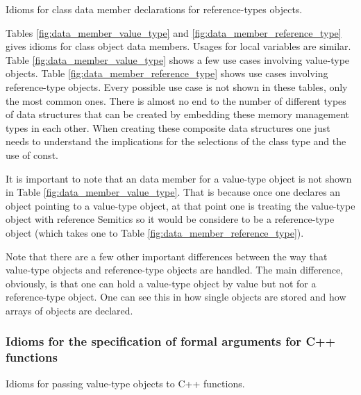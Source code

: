 \documentclass[pdf,ps2pdf,11pt]{SANDreport}
\begin{document}
\begin{table}
%
\begin{center}
%
%

%
%
\end{center}
\caption{\label{fig:data_member_reference_type}
Idioms for class data member declarations for reference-types
objects.}
%
\end{table}


Tables {}\ref{fig:data_member_value_type} and
{}\ref{fig:data_member_reference_type} gives idioms for class object
data members.  Usages for local variables are similar.  Table
{}\ref{fig:data_member_value_type} shows a few use cases involving
value-type objects.  Table {}\ref{fig:data_member_reference_type}
shows use cases involving reference-type objects.  Every possible use
case is not shown in these tables, only the most common ones.  There
is almost no end to the number of different types of data structures
that can be created by embedding these memory management types in each
other.  When creating these composite data structures one just needs
to understand the implications for the selections of the class type
and the use of const.

It is important to note that an {} data member for a
value-type object is not shown in Table
{}\ref{fig:data_member_value_type}.  That is because once one declares
an {} object pointing to a value-type object, at that point
one is treating the value-type object with reference Semitics so it
would be considere to be a reference-type object (which takes one to
Table {}\ref{fig:data_member_reference_type}).

Note that there are a few other important differences between the way
that value-type objects and reference-type objects are handled.  The
main difference, obviously, is that one can hold a value-type object
by value but not for a reference-type object.  One can see this in how
single objects are stored and how arrays of objects are declared.


%
{}\subsubsection{Idioms for the specification of formal arguments for
C++ functions}
\label{sec:idioms-for-passing-arguments}
%

\begin{table}[p]
%
\begin{center}
%
%

%
%
%
\end{center}
\caption{\label{fig:func_args_value_type}
Idioms for passing value-type objects to C++ functions.}
%
\end{table}
\end{document}
